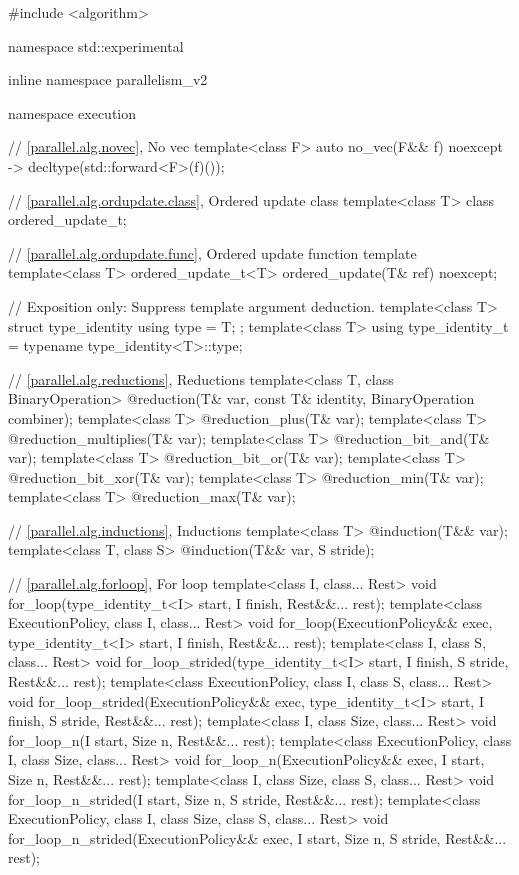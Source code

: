 \begin{codeblock}
#include <algorithm>

namespace std::experimental {
inline namespace parallelism_v2 {
namespace execution {
  // \ref{parallel.alg.novec}, No vec
  template<class F>
    auto no_vec(F&& f) noexcept -> decltype(std::forward<F>(f)());

  // \ref{parallel.alg.ordupdate.class}, Ordered update class
  template<class T>
    class ordered_update_t;

  // \ref{parallel.alg.ordupdate.func}, Ordered update function template
  template<class T>
    ordered_update_t<T> ordered_update(T& ref) noexcept;
}

// Exposition only: Suppress template argument deduction.
template<class T> struct type_identity { using type = T; };
template<class T> using type_identity_t = typename type_identity<T>::type;

// \ref{parallel.alg.reductions}, Reductions
template<class T, class BinaryOperation>
  @\unspec@ reduction(T& var, const T& identity, BinaryOperation combiner);
template<class T>
  @\unspec@ reduction_plus(T& var);
template<class T>
  @\unspec@ reduction_multiplies(T& var);
template<class T>
  @\unspec@ reduction_bit_and(T& var);
template<class T>
  @\unspec@ reduction_bit_or(T& var);
template<class T>
  @\unspec@ reduction_bit_xor(T& var);
template<class T>
  @\unspec@ reduction_min(T& var);
template<class T>
  @\unspec@ reduction_max(T& var);

// \ref{parallel.alg.inductions}, Inductions
template<class T>
  @\unspec@ induction(T&& var);
template<class T, class S>
  @\unspec@ induction(T&& var, S stride);

// \ref{parallel.alg.forloop}, For loop
template<class I, class... Rest>
  void for_loop(type_identity_t<I> start, I finish, Rest&&... rest);
template<class ExecutionPolicy,
         class I, class... Rest>
  void for_loop(ExecutionPolicy&& exec,
                type_identity_t<I> start, I finish, Rest&&... rest);
template<class I, class S, class... Rest>
  void for_loop_strided(type_identity_t<I> start, I finish,
                        S stride, Rest&&... rest);
template<class ExecutionPolicy,
         class I, class S, class... Rest>
  void for_loop_strided(ExecutionPolicy&& exec,
                        type_identity_t<I> start, I finish,
                        S stride, Rest&&... rest);
template<class I, class Size, class... Rest>
  void for_loop_n(I start, Size n, Rest&&... rest);
template<class ExecutionPolicy,
         class I, class Size, class... Rest>
  void for_loop_n(ExecutionPolicy&& exec,
                  I start, Size n, Rest&&... rest);
template<class I, class Size, class S, class... Rest>
  void for_loop_n_strided(I start, Size n, S stride, Rest&&... rest);
template<class ExecutionPolicy,
         class I, class Size, class S, class... Rest>
  void for_loop_n_strided(ExecutionPolicy&& exec,
                          I start, Size n, S stride, Rest&&... rest);
}
}
\end{codeblock}


